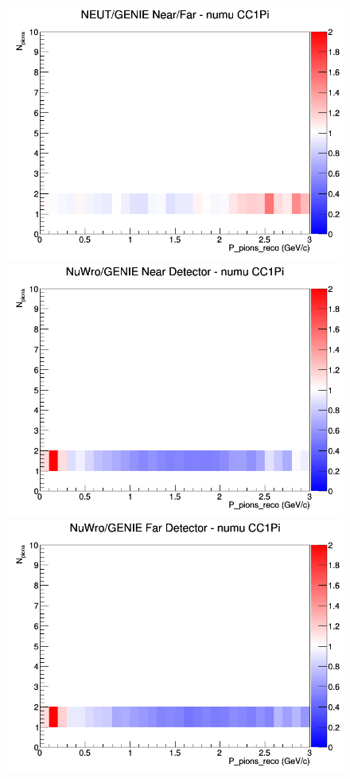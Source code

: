 \documentclass[12pt]{article}
\begin{document}
\begin{figure}[h]
\endminipage
{}
\includegraphics[width=\linewidth]{eff_N_P/LAr/pions/ratios/CC1Pi_NEUT_GENIE_numu_NF_N_P.png}
\endminipage
\newline
{}
\includegraphics[width=\linewidth]{eff_N_P/LAr/pions/ratios/CC1Pi_NuWro_GENIE_numu_near_N_P.png}
\endminipage
{}
\includegraphics[width=\linewidth]{eff_N_P/LAr/pions/ratios/CC1Pi_NuWro_GENIE_numu_far_N_P.png}

\end{figure}
\end{document}
